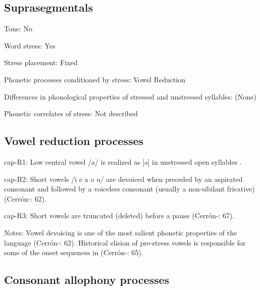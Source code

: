 {\subsection*{Suprasegmentals}
\begin{appendixdesc}
\item[Tone:] No

\item[Word stress:] Yes

\item[Stress placement:] Fixed

\item[Phonetic processes conditioned by stress:] Vowel Reduction

\item[Differences in phonological properties of stressed and unstressed syllables:] (None)

\item[Phonetic correlates of stress:] Not described
\end{appendixdesc}
\subsection*{Vowel reduction processes}
\begin{appendixdesc}

\item[cap-R1:] Low central vowel /a/ is realized as [ə] in unstressed open syllables \citep[301]{Olson1967}.

\item[cap-R2:] Short vowels /i e a o u/ are devoiced when preceded by an aspirated consonant and followed by a voiceless consonant (usually a non-sibilant fricative) (Cerrón-\citealt{Palomino2006}: 62).

\item[cap-R3:] Short vowels are truncated (deleted) before a pause (Cerrón-\citealt{Palomino2006}: 67).

\item[Notes:] Vowel devoicing is one of the most salient phonetic properties of the language (Cerrón-\citealt{Palomino2006}: 62). Historical elision of pre-stress vowels is responsible for some of the onset sequences in  (Cerrón-\citealt{Palomino2006}: 65).
\end{appendixdesc}
\subsection*{Consonant allophony processes}
\begin{appendixdesc}


\end{appendixdesc}}
